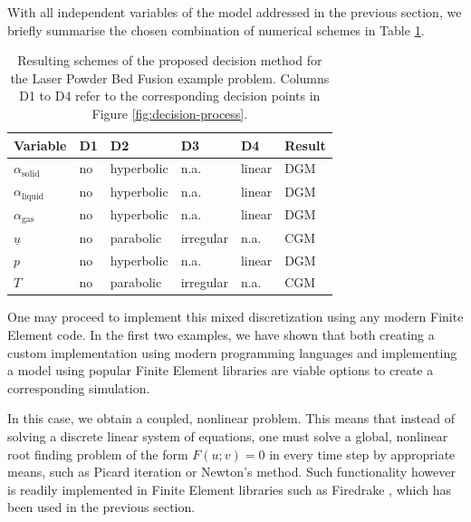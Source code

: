 \documentclass[asi,article,submit,moreauthors]{Definitions/mdpi}
\begin{document}
With all independent variables of the model addressed in the previous section, we briefly summarise the chosen combination of numerical schemes in Table \ref{tab:lpbf-summary}.
\begin{table}
    \centering
    \caption{Resulting schemes of the proposed decision method for the Laser Powder Bed Fusion example problem. Columns D1 to D4 refer to the corresponding decision points in Figure \ref{fig:decision-process}.}
    \label{tab:lpbf-summary}
    \begin{tabular}{llllll} 
    \toprule
    \textbf{Variable} & \textbf{D1} & \textbf{D2} & \textbf{D3} & \textbf{D4} & \textbf{Result} \\ 
    \hline
    $\alpha_\text{solid}$ & no & hyperbolic & n.a. & linear & DGM \\
    $\alpha_\text{liquid}$ & no & hyperbolic & n.a. & linear & DGM \\
    $\alpha_\text{gas}$ & no & hyperbolic & n.a. & linear & DGM \\
    $\underline{u}$ & no & parabolic & irregular & n.a. & CGM \\
    $p$ & no & hyperbolic & n.a. & linear & DGM \\
    $T$ & no & parabolic & irregular & n.a. & CGM \\
    \bottomrule
    \end{tabular}
    \end{table}
One may proceed to implement this mixed discretization using any modern Finite Element code.
In the first two examples, we have shown that both creating a custom implementation using modern programming languages and implementing a model using popular Finite Element libraries are viable options to create a corresponding simulation.

In this case, we obtain a coupled, nonlinear problem.
This means that instead of solving a discrete linear system of equations, one must solve a global, nonlinear root finding problem of the form $F(u;v) = 0$ in every time step by appropriate means, such as Picard iteration or Newton's method.
Such functionality however is readily implemented in Finite Element libraries such as Firedrake \cite{FiredrakeUserManual}, which has been used in the previous section.
\end{document}
